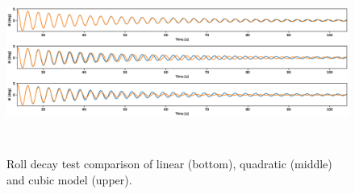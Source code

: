 \begin{figure}[H]
    \centering
    \includegraphics[width=12cm, height = 6cm ]{figures/roll_decay_model_compare.eps}
        \vspace{-0.5cm}
    \caption{Roll decay test comparison of linear (bottom), quadratic (middle) and cubic model (upper).}
    \label{fig:roll_decay_model_compare}
\end{figure}